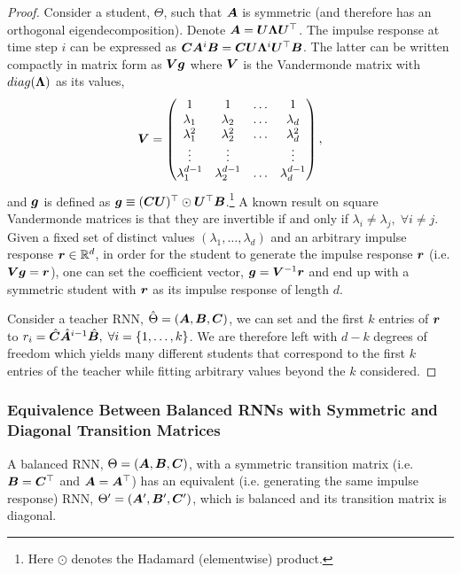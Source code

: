 \begin{proof}
    Consider a student, $\Theta$, such that ${\bm{A}}$ is symmetric (and therefore has an orthogonal eigendecomposition). Denote ${\bm{A}}={\bm{U}}{\bm{\Lambda}} {\bm{U}}^\top$. The impulse response at time step $i$ can be expressed as ${\bm{C}}{\bm{A}}^i{\bm{B}}={\bm{C}}{\bm{U}}{\bm{\Lambda}}^i {\bm{U}}^\top {\bm{B}}$. The latter can be written compactly in matrix form as ${\bm{V}}{\bm{g}}$ where ${\bm{V}}$ is the Vandermonde matrix with $diag({\bm{\Lambda}})$ as its values,
    \begin{equation*}
        {\bm{V}}=\begin{pmatrix}
            1 & 1 & \dots & 1\\
            \lambda_1 & \lambda_2 & \dots & \lambda_d\\
            \lambda_1^2 & \lambda_2^2 & \dots & \lambda_d^2\\
            \vdots & \vdots & & \vdots \\
            \lambda_1^{d-1} & \lambda_2^{d-1} & \dots & \lambda_d^{d-1}\\
        \end{pmatrix},
    \end{equation*}
    and ${\bm{g}}$ is defined as ${\bm{g}}\equiv ({\bm{C}}{\bm{U}})^\top\odot {\bm{U}}^\top {\bm{B}}$.\footnote{Here $\odot$ denotes the Hadamard (elementwise) product.} A known result on square Vandermonde matrices is that they are invertible if and only if $\lambda_i\neq \lambda_j,\; \forall i\neq j$. Given a fixed set of distinct values $(\lambda_1,\dots,\lambda_d)$ and an arbitrary impulse response ${\bm{r}}\in\mathbb{R}^d$, in order for the student to generate the impulse response ${\bm{r}}$ (i.e. ${\bm{V}}{\bm{g}}={\bm{r}}$), one can set the coefficient vector, ${\bm{g}}={\bm{V}}^{-1}{\bm{r}}$ and end up with a symmetric student with ${\bm{r}}$ as its impulse response of length $d$.
    
    Consider a teacher RNN, $\hat{\Theta}=\left({\bm{A}},{\bm{B}},{\bm{C}}\right)$, we can set and the first $k$ entries of ${\bm{r}}$ to $ {r}_i=\hat{{\bm{C}}}\hat{{\bm{A}}}^{i-1}\hat{{\bm{B}}},\; \forall i=\{1,\dots,k\}$. We are therefore left with $d-k$ degrees of freedom which yields many different students that correspond to the first $k$ entries of the teacher while fitting arbitrary values beyond the $k$ considered.
\end{proof}

\subsubsection{Equivalence Between Balanced RNNs with Symmetric and Diagonal Transition Matrices}
\begin{lemma}\label{lemma:equiv_diagonal_rnn}
A balanced RNN, $\Theta=({\bm{A}},{\bm{B}},{\bm{C}})$, with a symmetric transition matrix (i.e. ${\bm{B}}={\bm{C}}^\top$ and ${\bm{A}}={\bm{A}}^\top$) has an equivalent (i.e. generating the same impulse response) RNN, $\Theta'=({\bm{A}}',{\bm{B}}',{\bm{C}}')$, which is balanced and its transition matrix is diagonal.
\end{lemma}

